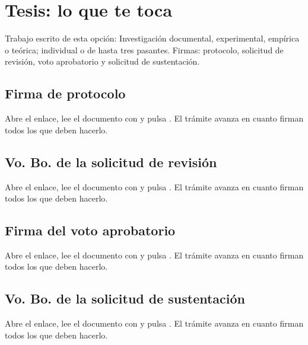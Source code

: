 \section{Tesis: lo que te toca}
Trabajo escrito de esta opción: Investigación documental, experimental, empírica o teórica; individual o de hasta tres pasantes. Firmas: protocolo, solicitud de revisión, voto aprobatorio y solicitud de sustentación.
\subsection{Firma de protocolo}
Abre el enlace, lee el documento con  y pulsa . El trámite avanza en cuanto firman todos los que deben hacerlo.
\subsection{Vo. Bo. de la solicitud de revisión}
Abre el enlace, lee el documento con  y pulsa . El trámite avanza en cuanto firman todos los que deben hacerlo.
\subsection{Firma del voto aprobatorio}
Abre el enlace, lee el documento con  y pulsa . El trámite avanza en cuanto firman todos los que deben hacerlo.
\subsection{Vo. Bo. de la solicitud de sustentación}
Abre el enlace, lee el documento con  y pulsa . El trámite avanza en cuanto firman todos los que deben hacerlo.
